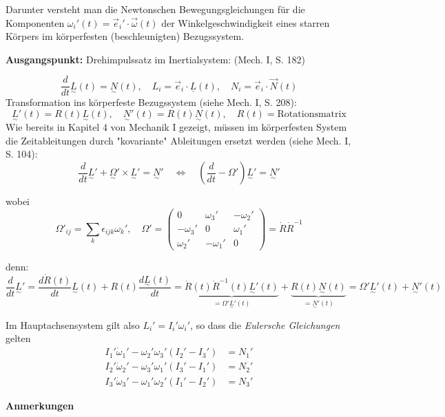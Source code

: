 \documentclass[10pt, letterpaper]{article}
\begin{document}
Darunter versteht man die Newtonschen Bewegungsgleichungen für die Komponenten $\omega_i'(t) = \vec{e}_i' \cdot \vec{\omega}(t)$ der Winkelgeschwindigkeit eines starren Körpers im körperfesten (beschleunigten) Bezugssystem.

\noindent
\textbf{Ausgangspunkt:} Drehimpulssatz im Inertialsystem: (Mech. I, S. 182)

\[\frac{d}{dt} \underset{\sim}{L}(t) = \underset{\sim}{N}(t), \quad L_i = \vec{e}_i \cdot \underline{L}(t), \quad N_i = \vec{e}_i \cdot \vec{N}(t)\]
Transformation ins körperfeste Bezugssystem (siehe Mech. I, S. 208):
\[\underset{\sim}{L}'(t) = R(t)\underset{\sim}{L}(t), \quad \underset{\sim}{N}'(t) = R(t)\underset{\sim}{N}(t), \quad R(t) = \text{Rotationsmatrix}\]
Wie bereits in Kapitel 4 von Mechanik I gezeigt, müssen im körperfesten System die Zeitableitungen durch "kovariante" Ableitungen ersetzt werden (siehe Mech. I, S. 104):
\[\frac{d}{dt}\underset{\sim}{L}' + \underset{\sim}{\Omega}' \times \underset{\sim}{L}' = \underset{\sim}{N}' \quad \Leftrightarrow \quad \left(\frac{d}{dt} - \Omega'\right)\underset{\sim}{L}' = \underset{\sim}{N}'\]

wobei \[\Omega'_{ij} = \sum_k \epsilon_{ijk}\omega_k', \quad \Omega' = \begin{pmatrix} 0 & \omega_3' & -\omega_2' \\ -\omega_3' & 0 & \omega_1' \\ \omega_2' & -\omega_1' & 0 \end{pmatrix} = \dot{R}\dot{R}^{-1}\]

denn: 
\[\frac{d}{dt}\underset{\sim}{L}' = \frac{d\dot{R}(t)}{dt}\underset{\sim}{L}(t) + R(t)\frac{d\underset{\sim}{L}(t)}{dt} = \underbrace{\dot{R}(t)\dot{R}^{-1}(t)\underset{\sim}{L}'(t)}_{=\Omega'\underset{\sim}{L}'(t)} + \underbrace{R(t)\underset{\sim}{N}(t)}_{=\underset{\sim}{N}'(t)}= \Omega'\underset{\sim}{L}'(t)+\underset{\sim}{N}'(t)\]

Im Hauptachsensystem gilt also $L_i' = I_i' \omega_i'$, so dass die \textit{Eulersche Gleichungen} gelten
\begin{align*}
I_1' \dot{\omega}_1' - \omega_2' \omega_3' (I_2'-I_3') &= N_1' \\
I_2' \dot{\omega}_2' - \omega_3' \omega_1' (I_3'-I_1') &= N_2' \\
I_3' \dot{\omega}_3' - \omega_1' \omega_2' (I_1'-I_2') &= N_3'
\end{align*}




\textbf{Anmerkungen}
\end{document}
